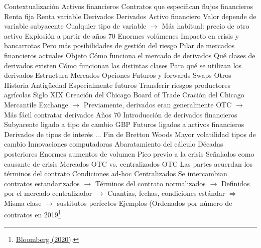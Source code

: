 \documentclass{nuevotema}
\begin{document}
\esquemalargo













\begin{esquemal}
	\1[] 
		\2 Contextualización
			\3 Activos financieros
				\4 Contratos que especifican flujos financieros
				\4 Renta fija
				\4 Renta variable
				\4 Derivados
			\3 Derivados
				\4 Activo financiero
				\4 Valor depende de variable subyacente
				\4 Cualquier tipo de variable
				\4[] $\to$ Más habitual: precio de otro activo
			\3 Explosión a partir de años 70
				\4 Enormes volúmenes
				\4 Impacto en crisis y bancarrotas
				\4 Pero más posibilidades de gestión del riesgo
				\4[$\Rightarrow$] Pilar de mercados financieros actuales
		\2 Objeto
			\3 Cómo funciona el mercado de derivados
			\3 Qué clases de derivados existen
			\3 Cómo funcionan las distintas clases
			\3 Para qué se utilizan los derivados
		\2 Estructura
			\3 Mercados
			\3 Opciones
			\3 Futuros y forwards
			\3 Swaps
			\3 Otros
	\1 
		\2 Historia
			\3 Antigüedad
				\4 Especialmente futuros
				\4 Transferir riesgos productores agrícolas
			\3 Siglo XIX
				\4 Creación del Chicago Board of Trade
				\4 Cración del Chicago Mercantile Exchange
				\4[] $\to$ Previamente, derivados eran generalmente OTC
				\4[] $\to$ Más fácil contratar derivados
			\3 Años 70
				\4 Introducción de derivados financieros
				\4[] Subyacente ligado a tipo de cambio GBP
				\4[] Futuros ligados a activos financieros
				\4[] Derivados de tipos de interés
				\4[] ...
				\4 Fin de Bretton Woods
				\4[] Mayor volatilidad tipos de cambio
				\4 Innovaciones computadoras
				\4[] Abaratamiento del cálculo
			\3 Décadas posteriores
				\4 Enormes aumentos de volumen
				\4 Pico previo a la crisis
				\4 Señalados como causante de crisis
		\2 Mercados OTC vs. centralizados
			\3 OTC
				\4 Las partes acuerdan los términos del contrato
				\4 Condiciones ad-hoc
			\3 Centralizados
				\4 Se intercambian contratos estandarizados
				\4[] $\to$ Términos del contrato normalizados
				\4[] $\to$ Definidos por el mercado centralizador
				\4[] $\to$ Cuantías, fechas, condiciones estándar
				\4[] $\Rightarrow$ Misma clase $\to$ sustitutos perfectos
				\4 Ejemplos
				\4[] (Ordenados por número de contratos en 2019\footnote{\href{https://www.bloomberg.com/news/articles/2020-01-21/india-now-has-world-s-largest-derivatives-exchange-by-volume}{Bloomberg (2020)}.}

\end{esquemal}
\end{document}
